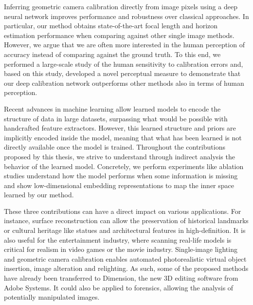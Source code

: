 Inferring geometric camera calibration directly from image pixels using a deep neural network improves performance and robustness over classical approaches. In particular, our method obtains state-of-the-art focal length and horizon estimation performance when comparing against other single image methods. However, we argue that we are often more interested in the human perception of accuracy instead of comparing against the ground truth. To this end, we performed a large-scale study of the human sensitivity to calibration errors and, based on this study, developed a novel perceptual measure to demonstrate that our deep calibration network outperforms other methods also in terms of human perception. 

Recent advances in machine learning allow learned models to encode the structure of data in large datasets, surpassing what would be possible with handcrafted feature extractors. However, this learned structure and priors are implicitly encoded inside the model, meaning that what has been learned is not directly available once the model is trained. Throughout the contributions proposed by this thesis, we strive to understand through indirect analysis the behavior of the learned model. Concretely, we perform experiments like ablation studies understand how the model performs when some information is missing and show low-dimensional embedding representations to map the inner space learned by our method. 


These three contributions can have a direct impact on various applications. For instance, surface reconstruction can allow the preservation of historical landmarks or cultural heritage like statues and architectural features in high-definition. It is also useful for the entertainment industry, where scanning real-life models is critical for realism in video games or the movie industry. Single-image lighting and geometric camera calibration enables automated photorealistic virtual object insertion, image alteration and relighting. As such, some of the proposed methods have already been transferred to Dimension, the new 3D editing software from Adobe Systems. It could also be applied to forensics, allowing the analysis of potentially manipulated images. 

